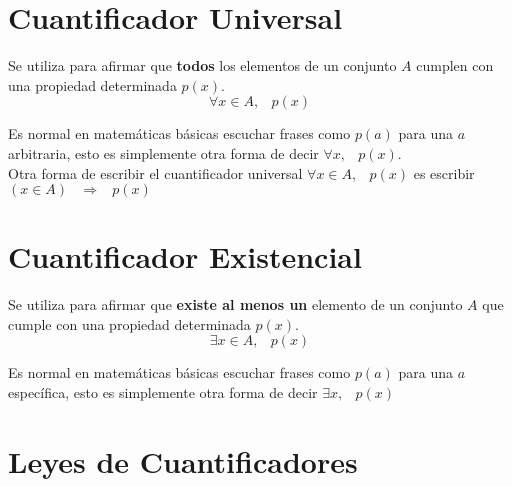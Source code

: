 \documentclass[12pt, fleqn]{report}                             %
\DeclareMathOperator \Space {\quad}                             %
\DeclareMathOperator \MiniSpace {\;}                            %
\newcommand \lequal {\MiniSpace \Leftrightarrow \MiniSpace}     %
\newcommand \linfire {\MiniSpace \Rightarrow \MiniSpace}        %
\begin{document}
        \clearpage
        \section{Cuantificador Universal}

            Se utiliza para afirmar que \textbf{todos} los elementos de un conjunto $A$ cumplen con una 
            propiedad determinada $p(x)$.
            \begin{equation*}
                \forall x \in A,\MiniSpace p(x)
            \end{equation*}

            Es normal en matemáticas básicas escuchar frases como $p(a)$ para una $a$ arbitraria, esto es
            simplemente otra forma de decir $\forall x ,\MiniSpace p(x)$.\\

            Otra forma de escribir el cuantificador universal $\forall x \in A,\MiniSpace p(x)$ es
            escribir $(x \in A) \linfire p(x)$



        \section{Cuantificador Existencial}

            Se utiliza para afirmar que \textbf{existe al menos un} elemento de un conjunto $A$ que 
            cumple con una propiedad determinada $p(x)$.
            \begin{equation*}
                \exists x \in A,\MiniSpace p(x)
            \end{equation*}

            Es normal en matemáticas básicas escuchar frases como $p(a)$ para una $a$ específica, esto es
            simplemente otra forma de decir $\exists x, \MiniSpace p(x)$



        \clearpage
        \section{Leyes de Cuantificadores}
                    
\end{document}
